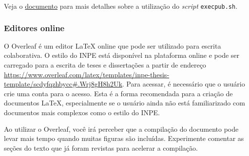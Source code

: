 \begin{marker}
  Veja o \href{http://mtc-m16d.sid.inpe.br/col/sid.inpe.br/mtc-m19@80/2010/03.24.15.12/doc/ambiente_latex_no_linux.pdf}{documento} para mais detalhes sobre a utilização do \textit{script} {\tt execpub.sh}.
\end{marker}

\subsubsection*{Editores online}
\label{sec:ed_online}

O Overleaf é um editor \LaTeX{} online que pode ser utilizado para escrita colaborativa. O estilo do INPE está disponível na plataforma online e pode ser carregado para a escrita de teses e dissertações a partir de endereço \url{https://www.overleaf.com/latex/templates/inpe-thesis-template/scdyfqzhbycc#.Wrj8gH8h2Uk}. Para acessar, é necessário que o usuário crie uma conta para o acesso. Esta é a forma recomendada para a criação de documentos \LaTeX{}, especialmente se o usuário ainda não está familiarizado com documentos mais complexos como o estilo do INPE.

\begin{marker}
  Ao utilizar o Overleaf, você irá perceber que a compilação do documento pode levar mais tempo quando muitas figuras são incluídas. Experimente comentar as seções do texto que já foram revistas para acelerar a compilação.
\end{marker}

